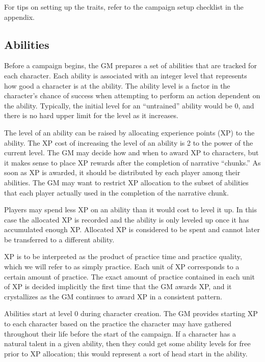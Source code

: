 For tips on setting up the traits, refer to the campaign setup checklist in the appendix.

\subsection*{Abilities}
Before a campaign begins, the GM prepares a set of abilities that are tracked for each character.
Each ability is associated with an integer level that represents how good a character is at the ability.
The ability level is a factor in the character’s chance of success when attempting to perform an action dependent on the ability.
Typically, the initial level for an “untrained” ability would be 0, and there is no hard upper limit for the level as it increases.

The level of an ability can be raised by allocating experience points (XP) to the ability.
The XP cost of increasing the level of an ability is 2 to the power of the current level.
The GM may decide how and when to award XP to characters, but it makes sense to place XP rewards after the completion of narrative ``chunks.''
As soon as XP is awarded, it should be distributed by each player among their abilities.
The GM may want to restrict XP allocation to the subset of abilities that each player actually used in the completion of the narrative chunk.

Players may spend less XP on an ability than it would cost to level it up.
In this case the allocated XP is recorded and the ability is only leveled up once it has accumulated enough XP.
Allocated XP is considered to be spent and cannot later be transferred to a different ability.

XP is to be interpreted as the product of practice time and practice quality, which we will refer to as simply practice.
Each unit of XP corresponds to a certain amount of practice.
The exact amount of practice contained in each unit of XP is decided implicitly the first time that the GM awards XP,
and it crystallizes as the GM continues to award XP in a consistent pattern.

Abilities start at level 0 during character creation.
The GM provides starting XP to each character based on the practice the character may have gathered throughout their life before the start of the campaign.
If a character has a natural talent in a given ability,
then they could get some ability levels for free prior to XP allocation; this would represent a sort of head start in the ability.

